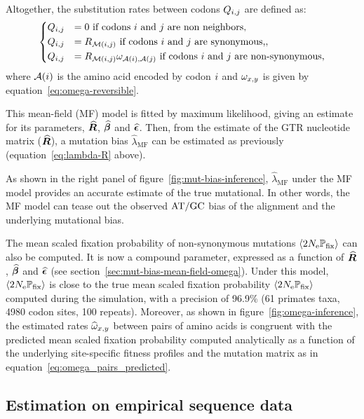 \documentclass{article}
\begin{document}
Altogether, the {substitution} rates between codons $Q_{{i}, {j}}$ are defined as:
\begin{equation}
 \begin{dcases}
 Q_{{i}, {j}} & = 0 \text{ if codons ${i}$ and ${j}$ are non neighbors}, \\
 Q_{{i}, {j}} & = R_{\mathcal{M}({i}, {j})} \text{ if codons ${i}$ and ${j}$ are {synonymous},}, \\
 Q_{{i}, {j}} & = R_{\mathcal{M}({i}, {j})} \omega_{\mathcal{A}({i}), \mathcal{A}({j})} \text{ if codons ${i}$ and ${j}$ are non-synonymous},
 \end{dcases}
 \label{eq:codon-mean-field}
\end{equation}
where $\mathcal{A}({i})$ is the amino acid encoded by codon ${i}$ and $\omega_{x, y}$ is given by equation~\ref{eq:omega-reversible}.

This mean-field ({MF}) model is fitted by maximum {likelihood}, giving an estimate for its parameters, $\widehat{\bm{R}}$, $\widehat{\bm{\beta}}$ and $\widehat{\bm{\epsilon}}$.
Then, from the estimate of the {GTR} nucleotide matrix ($\widehat{\bm{R}}$), a mutation bias $\widehat{\lambda}_{\text{{MF}}}$ can be estimated as previously (equation~\ref{eq:lambda-R} above).

As shown in the right panel of figure~\ref{fig:mut-bias-inference}, $\widehat{\lambda}_{\text{{MF}}}$ under the {MF} model provides an accurate estimate of the true mutational.
In other words, the {MF} model can tease out the observed $\text{AT/GC}$ bias of the alignment and the underlying mutational bias.

The mean scaled fixation probability of {non-synonymous} mutations $\left\langle 2 N_{\text{e}} \mathbb{P}_{\text{fix}} \right\rangle$ can also be computed.
It is now a compound parameter, expressed as a function of $\widehat{\bm{R}}$, $\widehat{\bm{\beta}}$ and $\widehat{\bm{\epsilon}}$ (see section~\ref{sec:mut-bias-mean-field-omega}).
Under this model, $\left\langle 2 N_{\text{e}} \mathbb{P}_{\text{fix}} \right\rangle$ is close to the true mean scaled fixation probability $\left\langle 2 N_{\text{e}} \mathbb{P}_{\text{fix}} \right\rangle$ computed during the simulation, with a precision of 96.9\% (61 primates taxa, 4980 codon sites, 100 repeats).
Moreover, as shown in figure~\ref{fig:omega-inference}, the estimated rates $\widehat{\omega}_{x, y}$ between pairs of amino acids is congruent with the predicted mean scaled fixation probability computed analytically as a function of the underlying site-specific fitness profiles and the mutation matrix as in equation~\ref{eq:omega_pairs_predicted}.

\subsection{Estimation on empirical sequence data}
\label{subsec:estimation-of-empirical-sequence-data}
\end{document}
